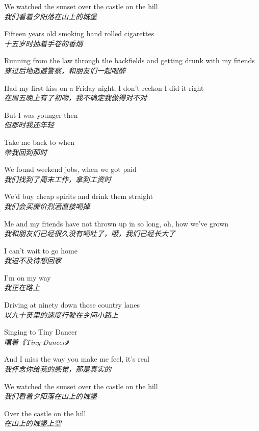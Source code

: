 \begin{spacing}{1.5}
\begin{flushleft}
We watched the sunset over the castle on the hill\\
\textit{我们看着夕阳落在山上的城堡}\lyricspace

Fifteen years old smoking hand rolled cigarettes\\
\textit{十五岁时抽着手卷的香烟}\lyricspace

Running from the law through the backfields and getting drunk with my friends\\
\textit{穿过后地逃避警察，和朋友们一起喝醉}\lyricspace

Had my first kiss on a Friday night, I don't reckon I did it right\\
\textit{在周五晚上有了初吻，我不确定我做得对不对}\lyricspace

But I was younger then\\
\textit{但那时我还年轻}\lyricspace

Take me back to when\\
\textit{带我回到那时}\lyricspace

We found weekend jobs, when we got paid\\
\textit{我们找到了周末工作，拿到工资时}\lyricspace

We'd buy cheap spirits and drink them straight\\
\textit{我们会买廉价烈酒直接喝掉}\lyricspace

Me and my friends have not thrown up in so long, oh, how we've grown\\
\textit{我和朋友们已经很久没有喝吐了，哦，我们已经长大了}\lyricspace

I can't wait to go home\\
\textit{我迫不及待想回家}\lyricspace

I'm on my way\\
\textit{我正在路上}\lyricspace

Driving at ninety down those country lanes\\
\textit{以九十英里的速度行驶在乡间小路上}\lyricspace

Singing to Tiny Dancer\\
\textit{唱着《Tiny Dancer》}\lyricspace

And I miss the way you make me feel, it's real\\
\textit{我怀念你给我的感觉，那是真实的}\lyricspace

We watched the sunset over the castle on the hill\\
\textit{我们看着夕阳落在山上的城堡}\lyricspace

Over the castle on the hill\\
\textit{在山上的城堡上空}\lyricspace


\end{flushleft}
\end{spacing}
